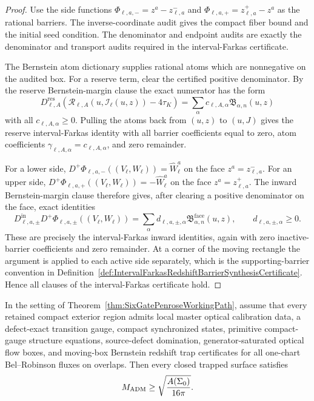\begin{proof}
Use the side functions
$\Phi_{\ell,a,-}=z^a-z_{\ell,a}^-$ and
$\Phi_{\ell,a,+}=z_{\ell,a}^+-z^a$ as the rational barriers.  The
inverse-coordinate audit gives the compact fiber bound and the initial seed
condition.  The denominator and endpoint audits are exactly the denominator and
transport audits required in the interval-Farkas certificate.

The Bernstein atom dictionary supplies rational atoms which are nonnegative on
the audited box.  For a reserve term, clear the certified positive denominator.
By the reserve Bernstein-margin clause the exact numerator has the form
\[
    D_{\ell,A}^{\mathrm{res}}
    \left(
        \mathcal R_{\ell,A}
        (u,\mathcal I_\ell(u,z))-4\tau_K
    \right)
    =
    \sum_\alpha c_{\ell,A,\alpha}\mathfrak B_{\alpha,n}(u,z)
\]
with all $c_{\ell,A,\alpha}\ge0$.  Pulling the atoms back from $(u,z)$ to
$(u,J)$ gives the reserve interval-Farkas identity with all barrier
coefficients equal to zero, atom coefficients
$\gamma_{\ell,A,\alpha}=c_{\ell,A,\alpha}$, and zero remainder.

For a lower side,
$D^+\Phi_{\ell,a,-}((V_\ell,W_\ell))=\widehat W_\ell^a$ on the face
$z^a=z_{\ell,a}^-$.  For an upper side,
$D^+\Phi_{\ell,a,+}((V_\ell,W_\ell))=-\widehat W_\ell^a$ on the face
$z^a=z_{\ell,a}^+$.  The inward Bernstein-margin clause therefore gives,
after clearing a positive denominator on the face, exact identities
\[
    D_{\ell,a,\pm}^{\mathrm{in}}
    D^+\Phi_{\ell,a,\pm}((V_\ell,W_\ell))
    =
    \sum_\alpha d_{\ell,a,\pm,\alpha}
    \mathfrak B_{\alpha,n}^{\mathrm{face}}(u,z),
    \qquad d_{\ell,a,\pm,\alpha}\ge0 .
\]
These are precisely the interval-Farkas inward identities, again with zero
inactive-barrier coefficients and zero remainder.  At a corner of the moving
rectangle the argument is applied to each active side separately, which is the
supporting-barrier convention in
Definition~\ref{def:IntervalFarkasRedshiftBarrierSynthesisCertificate}.  Hence
all clauses of the interval-Farkas certificate hold.
\end{proof}

\begin{corollary}\label{cor:MovingBoxLocalRoutePenrose}
In the setting of Theorem~\ref{thm:SixGatePenroseWorkingPath}, assume that
every retained compact exterior region admits local master optical calibration
data, a defect-exact transition gauge, compact synchronized states, primitive
compact-gauge structure equations, source-defect domination,
generator-saturated optical flow boxes, and moving-box Bernstein redshift trap
certificates for all one-chart Bel--Robinson fluxes on overlaps. Then every
closed trapped surface satisfies
\[
    M_{\mathrm{ADM}}\ge \sqrt{\frac{A(\Sigma_0)}{16\pi}} .
\]
\end{corollary}

